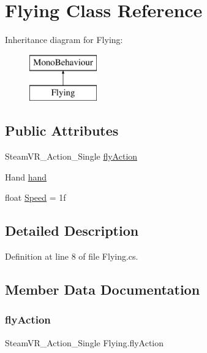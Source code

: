 \hypertarget{class_flying}{}\section{Flying Class Reference}
\label{class_flying}
Inheritance diagram for Flying\+:\begin{figure}[H]
\begin{center}
\leavevmode
\includegraphics[height=2.000000cm]{class_flying}
\end{center}
\end{figure}
\subsection*{Public Attributes}
\begin{DoxyCompactItemize}
\item 
Steam\+V\+R\+\_\+\+Action\+\_\+\+Single \mbox{\hyperlink{class_flying_a038c8686f992ad9dcf177d50eb5ca812}{fly\+Action}}
\item 
Hand \mbox{\hyperlink{class_flying_a7fd7c0cc8163fec9302c8a4a3a8e7190}{hand}}
\item 
float \mbox{\hyperlink{class_flying_ad0aaba54151449abeb89a6d285fb5ce1}{Speed}} = 1f
\end{DoxyCompactItemize}


\subsection{Detailed Description}


Definition at line 8 of file Flying.\+cs.



\subsection{Member Data Documentation}
\mbox{\label{class_flying_a038c8686f992ad9dcf177d50eb5ca812}} 
\subsubsection{\texorpdfstring{flyAction}{flyAction}}
{\footnotesize\ttfamily Steam\+V\+R\+\_\+\+Action\+\_\+\+Single Flying.\+fly\+Action}



